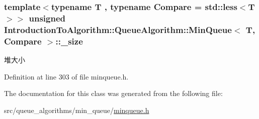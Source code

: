 \subsubsection[{\+\_\+size}]{\setlength{\rightskip}{0pt plus 5cm}template$<$typename T , typename Compare  = std\+::less$<$\+T$>$$>$ unsigned {\bf Introduction\+To\+Algorithm\+::\+Queue\+Algorithm\+::\+Min\+Queue}$<$ T, Compare $>$\+::\+\_\+size\hspace{0.3cm}{\ttfamily [private]}}\label{class_introduction_to_algorithm_1_1_queue_algorithm_1_1_min_queue_a6a4c6fb635e4c827d5511e1f6ac1ff67}
堆大小 

Definition at line 303 of file minqueue.\+h.



The documentation for this class was generated from the following file\+:\begin{DoxyCompactItemize}
\item 
src/queue\+\_\+algorithms/min\+\_\+queue/\hyperlink{minqueue_8h}{minqueue.\+h}\end{DoxyCompactItemize}
